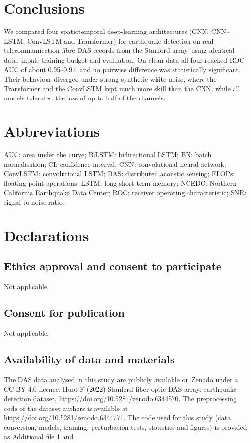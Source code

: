 \section*{Conclusions}
We compared four spatiotemporal deep-learning architectures (CNN, CNN--LSTM, ConvLSTM and Transformer) for earthquake detection on real telecommunication-fibre DAS records from the Stanford array, using identical data, input, training budget and evaluation. On clean data all four reached ROC-AUC of about 0.95--0.97, and no pairwise difference was statistically significant. Their behaviour diverged under strong synthetic white noise, where the Transformer and the ConvLSTM kept much more skill than the CNN, while all models tolerated the loss of up to half of the channels. %

\section*{Abbreviations}
AUC: area under the curve; BiLSTM: bidirectional LSTM; BN: batch normalisation; CI: confidence interval; CNN: convolutional neural network; ConvLSTM: convolutional LSTM; DAS: distributed acoustic sensing; FLOPs: floating-point operations; LSTM: long short-term memory; NCEDC: Northern California Earthquake Data Center; ROC: receiver operating characteristic; SNR: signal-to-noise ratio.

\section*{Declarations}
\subsection*{Ethics approval and consent to participate}
Not applicable.
\subsection*{Consent for publication}
Not applicable.
\subsection*{Availability of data and materials}
The DAS data analysed in this study are publicly available on Zenodo under a CC BY 4.0 licence: Huot F (2022) Stanford fiber-optic DAS array: earthquake detection dataset, \url{https://doi.org/10.5281/zenodo.6344570}. The preprocessing code of the dataset authors is available at \url{https://doi.org/10.5281/zenodo.6344771}. The code used for this study (data conversion, models, training, perturbation tests, statistics and figures) is provided as Additional file 1 and %
